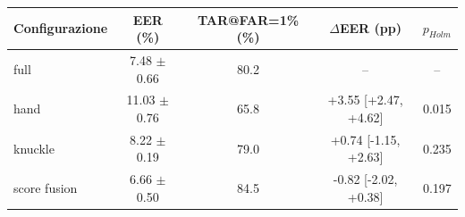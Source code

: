 \begin{tabular}{lcccc}
\toprule
Configurazione & EER (\%) & TAR@FAR=1\% (\%) & $\Delta$EER (pp) & $p_{Holm}$ \\
\midrule
full & 7.48 $\pm$ 0.66 & 80.2 & -- & -- \\
hand & 11.03 $\pm$ 0.76 & 65.8 & +3.55 [+2.47, +4.62] & 0.015 \\
knuckle & 8.22 $\pm$ 0.19 & 79.0 & +0.74 [-1.15, +2.63] & 0.235 \\
score fusion & 6.66 $\pm$ 0.50 & 84.5 & -0.82 [-2.02, +0.38] & 0.197 \\
\bottomrule
\end{tabular}